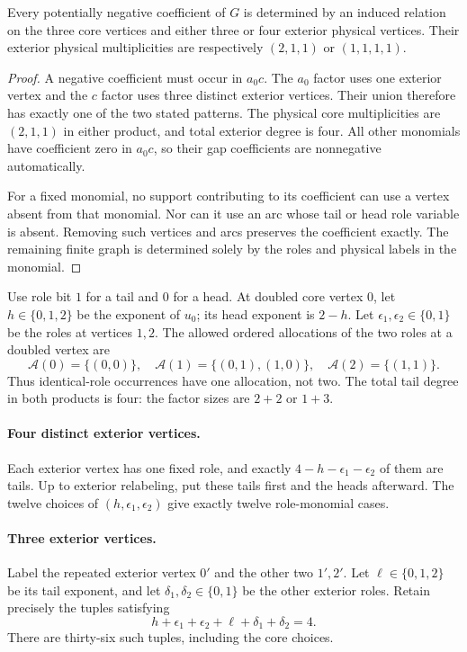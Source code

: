 \documentclass[11pt]{article}
\numberwithin{equation}{section}
\theoremstyle{definition}\newtheorem{definition}[theorem]{Definition}\newtheorem{remark}[theorem]{Remark}
\begin{document}
\begin{lemma}\label{pgr:r:tc:lem:localization}
Every potentially negative coefficient of $G$ is determined by an induced
relation on the three core vertices and either three or four exterior
physical vertices. Their exterior physical multiplicities are respectively
$(2,1,1)$ or $(1,1,1,1)$.
\end{lemma}
\begin{proof}
A negative coefficient must occur in $a_0c$. The $a_0$ factor uses one exterior
vertex and the $c$ factor uses three distinct exterior vertices. Their union
therefore has exactly one of the two stated patterns. The physical core
multiplicities are $(2,1,1)$ in either product, and total exterior degree is
four. All other monomials have coefficient zero in $a_0c$, so their gap
coefficients are nonnegative automatically.

For a fixed monomial, no support contributing to its coefficient can use a
vertex absent from that monomial. Nor can it use an arc whose tail or head
role variable is absent. Removing such vertices and arcs preserves the
coefficient exactly. The remaining finite graph is determined solely by the
roles and physical labels in the monomial.
\end{proof}

Use role bit $1$ for a tail and $0$ for a head. At doubled core vertex $0$,
let $h\in\{0,1,2\}$ be the exponent of $u_0$; its head exponent is $2-h$.
Let $\epsilon_1,\epsilon_2\in\{0,1\}$ be the roles at vertices $1,2$.
The allowed ordered allocations of the two roles at a doubled vertex are
\begin{equation}\label{pgr:r:tc:eq:allocations}
 \mathcal A(0)=\{(0,0)\},\quad
 \mathcal A(1)=\{(0,1),(1,0)\},\quad
 \mathcal A(2)=\{(1,1)\}.
\end{equation}
Thus identical-role occurrences have one allocation, not two. The total tail
degree in both products is four: the factor sizes are $2+2$ or $1+3$.

\paragraph{Four distinct exterior vertices.}
Each exterior vertex has one fixed role, and exactly
$4-h-\epsilon_1-\epsilon_2$ of them are tails. Up to exterior relabeling,
put these tails first and the heads afterward. The twelve choices of
$(h,\epsilon_1,\epsilon_2)$ give exactly twelve role-monomial cases.

\paragraph{Three exterior vertices.}
Label the repeated exterior vertex $0'$ and the other two $1',2'$. Let
$\ell\in\{0,1,2\}$ be its tail exponent, and let
$\delta_1,\delta_2\in\{0,1\}$ be the other exterior roles. Retain precisely
the tuples satisfying
\begin{equation}\label{pgr:r:tc:eq:balance}
 h+\epsilon_1+\epsilon_2+\ell+\delta_1+\delta_2=4.
\end{equation}
There are thirty-six such tuples, including the core choices.
\end{document}
